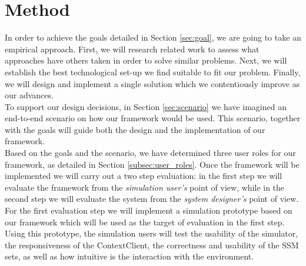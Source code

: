 \section{Method} %
\label{sec:method}
In order to achieve the goals detailed in Section \ref{sec:goal}, we are going to take an empirical approach. First, we will research related work to assess what approaches have others taken in order to solve similar problems. Next, we will establish the best technological set-up we find suitable to fit our problem. Finally, we will design and implement a single solution which we contentiously improve as our advances.\\


To support our design decisions, in Section \ref{sec:scenario} we have imagined an end-to-end scenario on how our framework would be used. This scenario, together with the goals will guide both the design and the implementation of our framework.\\

Based on the goals and the scenario, we have determined three user roles for our framework, as detailed in Section \ref{subsec:user_roles}. Once the framework will be implemented we will carry out a two step evaluation: in the first step we will evaluate the framework from the \emph{simulation user's} point of view, while in the second step we will evaluate the system from the \emph{system designer's} point of view.\\

For the first evaluation step we will implement a simulation prototype based on our framework which will be used as the target of evaluation in the first step. Using this prototype, the simulation users will test the usability of the simulator, the responsiveness of the ContextClient, the correctness and usability of the SSM sets, as well as how intuitive is the interaction with the environment.\\

